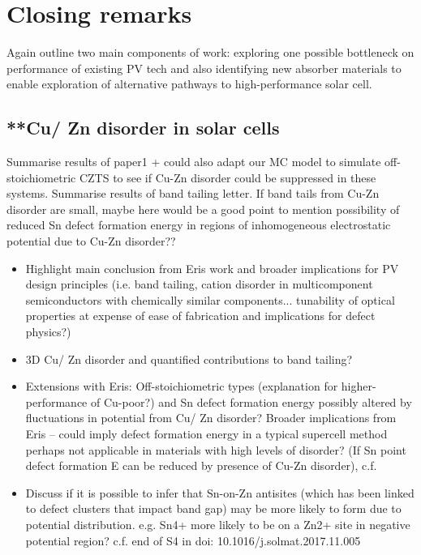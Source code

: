 \documentclass[11pt, twoside]{report}
\begin{document}
\chapter{Closing remarks}
Again outline two main components of work: exploring one possible bottleneck on performance of existing PV tech and also identifying new absorber materials to enable exploration of alternative pathways to high-performance solar cell.

\section{**Cu/ Zn disorder in {\CZTS} solar cells}
Summarise results of paper1 + could also adapt our MC model to simulate off-stoichiometric CZTS to see if Cu-Zn disorder could be suppressed in these systems. Summarise results of band tailing letter. If band tails from Cu-Zn disorder are small, maybe here would be a good point to mention possibility of reduced Sn defect formation energy in regions of inhomogeneous electrostatic potential due to Cu-Zn disorder??
\begin{itemize}
\item Highlight main conclusion from Eris work and broader implications for PV design principles (i.e. band tailing, cation disorder in multicomponent semiconductors with chemically similar components... tunability of optical properties at expense of ease of fabrication and implications for defect physics?)
\item 3D Cu/ Zn disorder and quantified contributions to band tailing?
\item Extensions with Eris: Off-stoichiometric types (explanation for higher-performance of Cu-poor?) and Sn defect formation energy possibly altered by fluctuations in potential from Cu/ Zn disorder? Broader implications from Eris – could imply defect formation energy in a typical supercell method perhaps not applicable in materials with high levels of disorder? (If Sn point defect formation E can be reduced by presence of Cu-Zn disorder), c.f. \cite{NREL_CZTS2}
\item Discuss if it is possible to infer that Sn-on-Zn antisites (which has been linked to defect clusters that impact band gap) may be more likely to form due to potential distribution. e.g. Sn4+ more likely to be on a Zn2+ site in negative potential region? c.f. end of S4 in doi: 10.1016/j.solmat.2017.11.005
\end{itemize}
\end{document}

